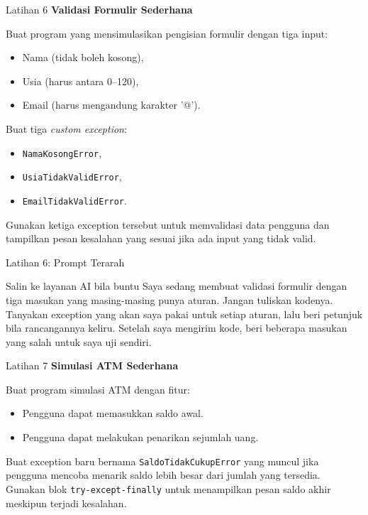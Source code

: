 \documentclass[aspectratio=169, table]{beamer}
\begin{document}
\begin{frame}[fragile,allowframebreaks=0.8]{Latihan 6}
\footnotesize
\textbf{Validasi Formulir Sederhana}\par\medskip
Buat program yang mensimulasikan pengisian formulir dengan tiga input:
    \begin{itemize}
        \item Nama (tidak boleh kosong),
        \item Usia (harus antara 0–120),
        \item Email (harus mengandung karakter '@').
    \end{itemize}
    Buat tiga \textit{custom exception}:
    \begin{itemize}
        \item \texttt{NamaKosongError},
        \item \texttt{UsiaTidakValidError},
        \item \texttt{EmailTidakValidError}.
    \end{itemize}
    Gunakan ketiga exception tersebut untuk memvalidasi data pengguna dan tampilkan pesan kesalahan yang sesuai jika ada input yang tidak valid.
\end{frame}

\begin{frame}{Latihan 6: Prompt Terarah}
\begin{block}{Salin ke layanan AI bila buntu}
\small Saya sedang membuat validasi formulir dengan tiga masukan yang masing-masing punya aturan. Jangan tuliskan kodenya. Tanyakan exception yang akan saya pakai untuk setiap aturan, lalu beri petunjuk bila rancangannya keliru. Setelah saya mengirim kode, beri beberapa masukan yang salah untuk saya uji sendiri.
\end{block}
\end{frame}

\begin{frame}[fragile,allowframebreaks=0.8]{Latihan 7}
\footnotesize
\textbf{Simulasi ATM Sederhana}\par\medskip
Buat program simulasi ATM dengan fitur:
    \begin{itemize}
        \item Pengguna dapat memasukkan saldo awal.
        \item Pengguna dapat melakukan penarikan sejumlah uang.
    \end{itemize}
    Buat exception baru bernama \texttt{SaldoTidakCukupError} yang muncul jika pengguna mencoba menarik saldo lebih besar dari jumlah yang tersedia.  
    Gunakan blok \texttt{try-except-finally} untuk menampilkan pesan saldo akhir meskipun terjadi kesalahan.
\end{frame}
\end{document}
